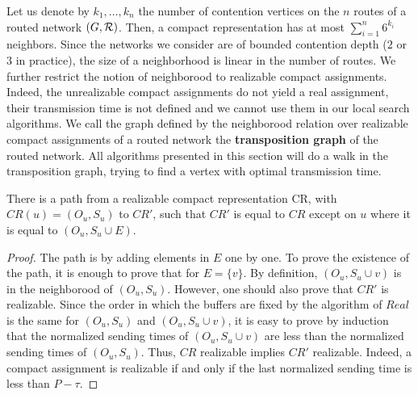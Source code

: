  Let us denote by $k_1,\ldots,k_n$ the number of contention vertices on the $n$ routes of 
 a routed network $(G,\cal{R})$. Then, a compact representation has at most $\sum_{i=1}^n 6^{k_i}$ neighbors. Since the networks we consider are of bounded contention depth ($2$ or $3$ in practice), the size of a neighborhood is linear in the number of routes.  We further restrict the notion of neighborood to realizable compact assignments. Indeed, the unrealizable compact assignments do not yield a real assignment, their transmission time is not defined and we cannot use them in our local search algorithms. We call the graph defined by the neighborood relation over realizable compact assignments of a routed network the \textbf{transposition graph} of the routed network. 
  All algorithms presented in this section will do a walk in the transposition graph, trying to find a vertex with optimal
  transmission time. 



\begin{lemma}\label{lemma:path}
There is a path from a realizable compact representation CR, with $CR(u) = (O_u,S_u)$ to $CR'$, such that 
$CR'$ is equal to $CR$ except on $u$ where it is equal to $(O_u,S_u \cup E)$.  
\end{lemma}
\begin{proof}
The path is by adding elements in $E$ one by one. 
 To prove the existence of the path, it is enough to prove that for  $E = \{v\}$. By definition, $(O_u,S_u \cup{v})$ is in the neighborood of $(O_u,S_u)$. However, one should also prove that $CR'$ is realizable.
  Since the order in which the buffers are fixed by the algorithm of $Real$ is the same for $(O_u,S_u)$ and $(O_u,S_u \cup{v})$, it is easy to prove by induction that the normalized sending times of $(O_u,S_u \cup{v})$ are less than the normalized sending times of $(O_u,S_u)$. Thus, $CR$ realizable implies $CR'$ realizable. Indeed, 
a compact assignment is realizable if and only if the last normalized sending time is less than $P - \tau$.
\end{proof}



